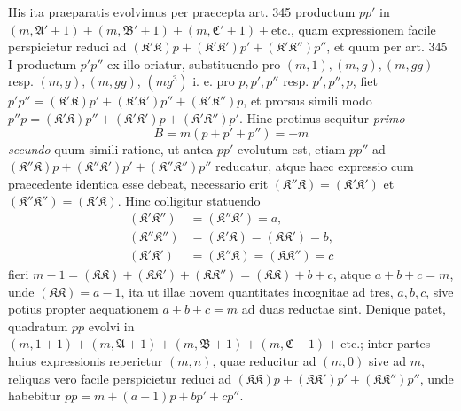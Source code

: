 His ita praeparatis evolvimus per praecepta art. 345 productum \(pp'\) in \((m,\mathfrak A'+1)+(m,\mathfrak B'+1)+(m,\mathfrak C'+1)+\text{etc.}\), quam expressionem facile perspicietur reduci ad \((\mathfrak K'\mathfrak K)p+(\mathfrak K'\mathfrak K')p'+(\mathfrak K'\mathfrak K'')p''\), et quum per art. 345 I productum \(p'p''\) ex illo oriatur, substituendo pro \((m,1),\allowbreak (m,g),\allowbreak (m,gg)\) resp. \((m,g),\allowbreak (m,gg)\), \((mg^3)\) i. e. pro \(p,\allowbreak p',\allowbreak p''\) resp. \(p',\allowbreak p'',\allowbreak p\), fiet \(p'p''=(\mathfrak K'\mathfrak K)p'+(\mathfrak K'\mathfrak K')p''+(\mathfrak K'\mathfrak K'')p\), et prorsus simili modo \(p''p=(\mathfrak K'\mathfrak K)p''+(\mathfrak K'\mathfrak K')p+(\mathfrak K'\mathfrak K'')p'\). Hinc protinus sequitur \textit{primo} \[B=m(p+p'+p'')=-m\] \textit{secundo} quum simili ratione, ut antea \(pp'\) evolutum est, etiam \(pp''\) ad \((\mathfrak K''\mathfrak K)p+(\mathfrak K''\mathfrak K')p'+(\mathfrak K''\mathfrak K'')p''\) reducatur, atque haec expressio cum praecedente identica esse debeat, necessario erit \((\mathfrak K''\mathfrak K)=(\mathfrak K'\mathfrak K')\) et \((\mathfrak K''\mathfrak K'')=(\mathfrak K'\mathfrak K)\). Hinc colligitur statuendo \[\begin{aligned}(\mathfrak K'\mathfrak K'')&=(\mathfrak K''\mathfrak K')=a,\\(\mathfrak K''\mathfrak K'')&=(\mathfrak K'\mathfrak K)=(\mathfrak K\mathfrak K')=b,\\(\mathfrak K'\mathfrak K')&=(\mathfrak K''\mathfrak K)=(\mathfrak K\mathfrak K'')=c\end{aligned}\] fieri \(m-1=(\mathfrak K\mathfrak K)+(\mathfrak K\mathfrak K')+(\mathfrak K\mathfrak K'')=(\mathfrak K\mathfrak K)+b+c\), atque \(a+b+c=m\), unde \((\mathfrak K\mathfrak K)=a-1\), ita ut illae novem quantitates incognitae ad tres, \(a,\allowbreak b,\allowbreak c\), sive potius propter aequationem \(a+b+c=m\) ad duas reductae sint. Denique patet, quadratum \(pp\) evolvi in \((m,1+1)+(m,\mathfrak A+1)+(m,\mathfrak B+1)+(m,\mathfrak C+1)+\text{etc.}\); inter partes huius expressionis reperietur \((m,n)\), quae reducitur ad \((m,0)\) sive ad \(m\), reliquas vero facile perspicietur reduci ad \((\mathfrak K\mathfrak K)p+(\mathfrak K\mathfrak K')p'+(\mathfrak K\mathfrak K'')p''\), unde habebitur \(pp=m+(a-1)p+bp'+cp''\).

